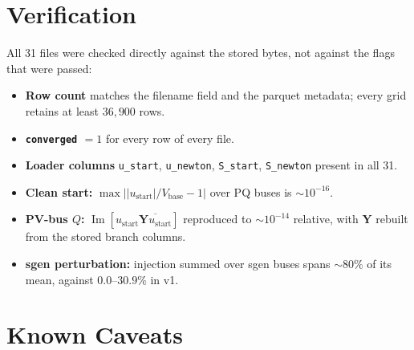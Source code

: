 \documentclass{article}
\begin{document}
\section{Verification}

All 31 files were checked directly against the stored bytes, not against the
flags that were passed:

\begin{itemize}[leftmargin=*]
\item \textbf{Row count} matches the filename field and the parquet metadata;
  every grid retains at least $36{,}900$ rows.
\item \textbf{\texttt{converged} $=1$} for every row of every file.
\item \textbf{Loader columns} \texttt{u\_start}, \texttt{u\_newton},
  \texttt{S\_start}, \texttt{S\_newton} present in all 31.
\item \textbf{Clean start:} $\max\bigl||u_{\text{start}}|/V_{\text{base}} - 1\bigr|$
  over PQ buses is ${\sim}10^{-16}$.
\item \textbf{PV-bus $Q$:} $\operatorname{Im}[u_{\text{start}}\overline{\mathbf{Y}u_{\text{start}}}]$
  reproduced to ${\sim}10^{-14}$ relative, with $\mathbf{Y}$ rebuilt from the
  stored branch columns.
\item \textbf{sgen perturbation:} injection summed over sgen buses spans
  ${\sim}80\%$ of its mean, against $0.0$--$30.9\%$ in v1.
\end{itemize}


\section{Known Caveats}
\end{document}
